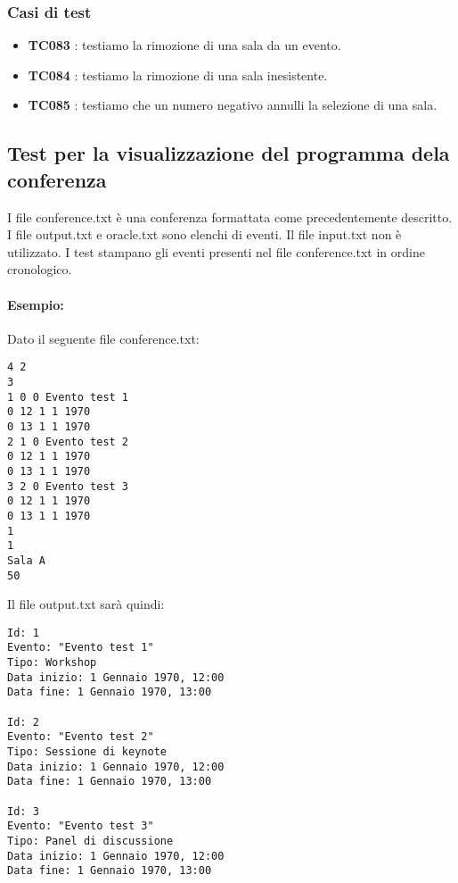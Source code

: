 \documentclass[11pt]{scrartcl} %
\begin{document}
\subsubsection{Casi di test}


\begin{itemize}

	\item \textbf{TC083} : testiamo la rimozione di una sala da un evento.

	\item \textbf{TC084} : testiamo la rimozione di una sala inesistente.

	\item \textbf{TC085} : testiamo che un numero negativo annulli la selezione di una sala.

\end{itemize}


\subsection{Test per la visualizzazione del programma dela conferenza}

I file conference.txt è una conferenza formattata come precedentemente descritto. I file output.txt e oracle.txt sono elenchi di eventi. Il file input.txt non è utilizzato. I test stampano gli eventi presenti nel file conference.txt in ordine cronologico.

\paragraph{Esempio:}
Dato il seguente file conference.txt:
\begin{lstlisting}
4 2
3
1 0 0 Evento test 1
0 12 1 1 1970
0 13 1 1 1970
2 1 0 Evento test 2
0 12 1 1 1970
0 13 1 1 1970
3 2 0 Evento test 3
0 12 1 1 1970
0 13 1 1 1970
1
1
Sala A
50
\end{lstlisting}

Il file output.txt sarà quindi:

\begin{lstlisting}
Id: 1
Evento: "Evento test 1"
Tipo: Workshop
Data inizio: 1 Gennaio 1970, 12:00
Data fine: 1 Gennaio 1970, 13:00

Id: 2
Evento: "Evento test 2"
Tipo: Sessione di keynote
Data inizio: 1 Gennaio 1970, 12:00
Data fine: 1 Gennaio 1970, 13:00

Id: 3
Evento: "Evento test 3"
Tipo: Panel di discussione
Data inizio: 1 Gennaio 1970, 12:00
Data fine: 1 Gennaio 1970, 13:00

\end{lstlisting}
\end{document}
